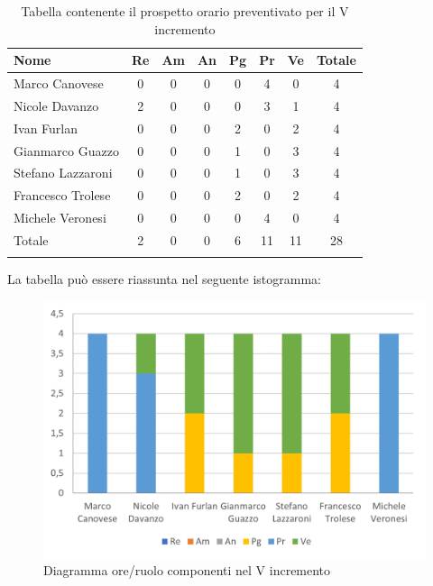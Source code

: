 \begin{longtable}{|l|c|c|c|c|c|c|c|}
	\hline
	\rowcolor{lighter-grayer}
	\textbf{Nome}     & \textbf{Re} & \textbf{Am} & \textbf{An} & \textbf{Pg} & \textbf{Pr} & \textbf{Ve} & \textbf{Totale} \\
	\hline
	\endfirsthead

	\hline
	Marco Canovese    & 0           & 0           & 0           & 0           & 4           & 0           & 4               \\
	\hline
	\hline
	Nicole Davanzo    & 2           & 0           & 0           & 0           & 3           & 1           & 4               \\
	\hline
	\hline
	Ivan Furlan       & 0           & 0           & 0           & 2           & 0           & 2           & 4               \\
	\hline
	\hline
	Gianmarco Guazzo  & 0           & 0           & 0           & 1           & 0           & 3           & 4               \\
	\hline
	\hline
	Stefano Lazzaroni & 0           & 0           & 0           & 1           & 0           & 3           & 4               \\
	\hline
	\hline
	Francesco Trolese & 0           & 0           & 0           & 2           & 0           & 2           & 4               \\
	\hline
	\hline
	Michele Veronesi  & 0           & 0           & 0           & 0           & 4           & 0           & 4               \\
	\hline
	\hline
	Totale            & 2          & 0          & 0          & 6           & 11           & 11          & 28              \\
	\hline
	\rowcolor{white}
	\caption{Tabella contenente il prospetto orario preventivato per il V incremento}
\end{longtable}


La tabella può essere riassunta nel seguente istogramma:

\begin{figure}[H]
	\centering
	\includegraphics[width=0.8\linewidth]{res/images/preventivo/dettaglio_implementazione/2-1.png}
	\caption{Diagramma ore/ruolo componenti nel V incremento}
	\label{fig:diagramma suddivisione ruoli V incremento}
\end{figure}


